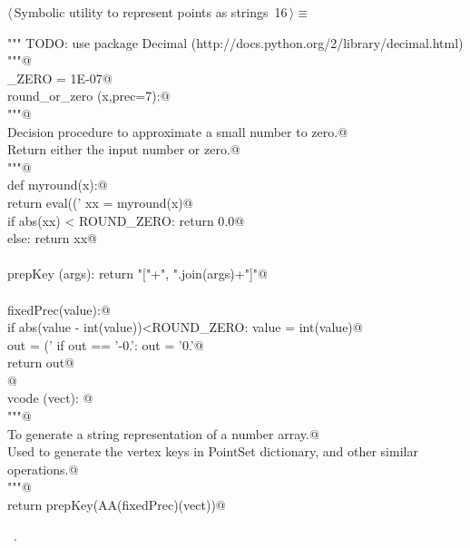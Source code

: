 \documentclass[11pt,oneside]{article}	%
\begin{document}
\begin{flushleft} \small \label{scrap27}
\protect{}$\langle\,$Symbolic utility to represent points as strings\nobreak\ {\footnotesize 16}$\,\rangle\equiv$
\vspace{-1ex}
\begin{list}{}{} \item
\mbox{}\verb@""" TODO: use package Decimal (http://docs.python.org/2/library/decimal.html) """@\\
\mbox{}\verb@ROUND_ZERO = 1E-07@\\
\mbox{}\verb@def round_or_zero (x,prec=7):@\\
\mbox{}\verb@   """@\\
\mbox{}\verb@   Decision procedure to approximate a small number to zero.@\\
\mbox{}\verb@   Return either the input number or zero.@\\
\mbox{}\verb@   """@\\
\mbox{}\verb@   def myround(x):@\\
\mbox{}\verb@      return eval(('%.'+str(prec)+'f') % round(x,prec))@\\
\mbox{}\verb@   xx = myround(x)@\\
\mbox{}\verb@   if abs(xx) < ROUND_ZERO: return 0.0@\\
\mbox{}\verb@   else: return xx@\\
\mbox{}\verb@@\\
\mbox{}\verb@def prepKey (args): return "["+", ".join(args)+"]"@\\
\mbox{}\verb@@\\
\mbox{}\verb@def fixedPrec(value):@\\
\mbox{}\verb@   if abs(value - int(value))<ROUND_ZERO: value = int(value)@\\
\mbox{}\verb@   out = ('%0.7f'% value).rstrip('0')@\\
\mbox{}\verb@   if out == '-0.': out = '0.'@\\
\mbox{}\verb@   return out@\\
\mbox{}\verb@   @\\
\mbox{}\verb@def vcode (vect): @\\
\mbox{}\verb@   """@\\
\mbox{}\verb@   To generate a string representation of a number array.@\\
\mbox{}\verb@   Used to generate the vertex keys in PointSet dictionary, and other similar operations.@\\
\mbox{}\verb@   """@\\
\mbox{}\verb@   return prepKey(AA(fixedPrec)(vect))@\\
\mbox{}\verb@@{\NWsep}
\end{list}
\vspace{-1ex}
\footnotesize\addtolength{\baselineskip}{-1ex}
\begin{list}{}{\setlength{\itemsep}{-\parsep}\setlength{\itemindent}{-\leftmargin}}
\item \NWtxtMacroRefIn\ .
\end{list}
\end{flushleft}







\end{document}
